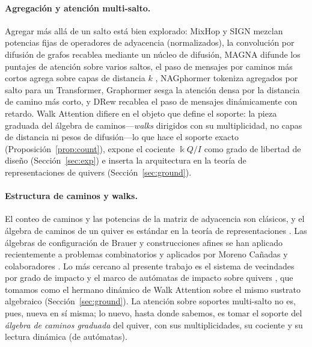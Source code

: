 \documentclass[runningheads]{llncs}
\newcommand{\kk}{\Bbbk}                 %
\newcommand{\kQ}{\kk Q}                 %
\begin{document}
\paragraph{Agregaci\'on y atenci\'on multi-salto.}
Agregar m\'as all\'a de un salto est\'a bien explorado: MixHop \cite{abu2019mixhop}
y SIGN \cite{frasca2020sign} mezclan potencias fijas de operadores de adyacencia
(normalizados), la convoluci\'on por difusi\'on de grafos
\cite{gasteiger2019diffusion} recablea mediante un n\'ucleo de difusi\'on, MAGNA
\cite{wang2021magna} difunde los puntajes de atenci\'on sobre varios saltos, el
paso de mensajes por caminos m\'as cortos agrega sobre capas de distancia $k$
\cite{abboud2022shortest}, NAGphormer \cite{chen2023nagphormer} tokeniza
agregados por salto para un Transformer, Graphormer \cite{ying2021graphormer}
sesga la atenci\'on densa por la distancia de camino m\'as corto, y DRew
\cite{gutteridge2023drew} recablea el paso de mensajes din\'amicamente con
retardo. Walk Attention difiere en el objeto que define el soporte: la pieza
graduada del \'algebra de caminos---\emph{walks} dirigidos con su multiplicidad,
no capas de distancia ni pesos de difusi\'on---lo que hace el soporte exacto
(Proposici\'on~\ref{prop:count}), expone el cociente $\kQ/I$ como grado de
libertad de dise\~no (Secci\'on~\ref{sec:exp}) e inserta la arquitectura en la
teor\'ia de representaciones de quivers (Secci\'on~\ref{sec:ground}).

\paragraph{Estructura de caminos y walks.}
El conteo de caminos y las potencias de la matriz de adyacencia son cl\'asicos, y
el \'algebra de caminos de un quiver es est\'andar en la teor\'ia de
representaciones \cite{schiffler2014quiver,assem2006elements}. Las \'algebras de
configuraci\'on de Brauer y construcciones afines se han aplicado recientemente a
problemas combinatorios y aplicados por Moreno Ca\~nadas y colaboradores
\cite{moreno2021brauer,moreno2024integer}. Lo m\'as cercano al presente trabajo es
el sistema de vecindades por grado de impacto y el marco de aut\'omatas de impacto
sobre quivers \cite{zainea2026aiq,ibanez2025casimulations}, que tomamos como el
hermano din\'amico de Walk Attention sobre el mismo sustrato algebraico
(Secci\'on~\ref{sec:ground}). La atenci\'on sobre soportes multi-salto no es,
pues, nueva en s\'i misma; lo nuevo, hasta donde sabemos, es tomar el soporte del
\emph{\'algebra de caminos graduada} del quiver, con sus multiplicidades, su
cociente y su lectura din\'amica (de aut\'omatas).








\end{document}

